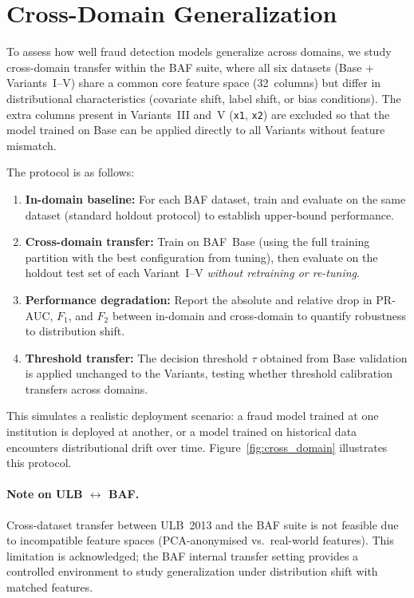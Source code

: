 \section{Cross-Domain Generalization}
\label{sec:cross_domain}

To assess how well fraud detection models generalize across domains, we study cross-domain transfer within the BAF suite, where all six datasets (Base + Variants~I--V) share a common core feature space (32~columns) but differ in distributional characteristics (covariate shift, label shift, or bias conditions). The extra columns present in Variants~III and~V (\texttt{x1}, \texttt{x2}) are excluded so that the model trained on Base can be applied directly to all Variants without feature mismatch.

The protocol is as follows:
\begin{enumerate}
  \item \textbf{In-domain baseline:} For each BAF dataset, train and evaluate on the same dataset (standard holdout protocol) to establish upper-bound performance.
  \item \textbf{Cross-domain transfer:} Train on BAF~Base (using the full training partition with the best configuration from tuning), then evaluate on the holdout test set of each Variant~I--V \emph{without retraining or re-tuning}.
  \item \textbf{Performance degradation:} Report the absolute and relative drop in PR-AUC, $F_1$, and $F_2$ between in-domain and cross-domain to quantify robustness to distribution shift.
  \item \textbf{Threshold transfer:} The decision threshold $\tau$ obtained from Base validation is applied unchanged to the Variants, testing whether threshold calibration transfers across domains.
\end{enumerate}

This simulates a realistic deployment scenario: a fraud model trained at one institution is deployed at another, or a model trained on historical data encounters distributional drift over time. Figure~\ref{fig:cross_domain} illustrates this protocol.

\paragraph{Note on ULB \texorpdfstring{$\leftrightarrow$}{<->} BAF.}
Cross-dataset transfer between ULB~2013 and the BAF suite is not feasible due to incompatible feature spaces (PCA-anonymised vs.\ real-world features). This limitation is acknowledged; the BAF internal transfer setting provides a controlled environment to study generalization under distribution shift with matched features.


